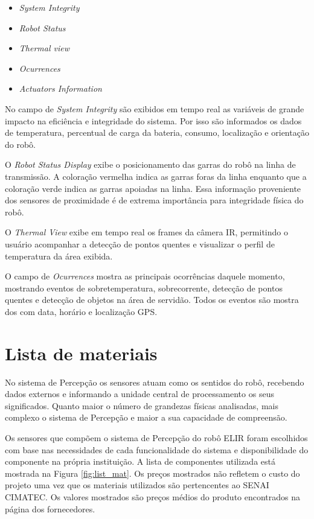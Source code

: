 \begin{itemize}
	\item \textit{System Integrity}
	\item \textit{Robot Status}
	\item \textit{Thermal view}
	\item \textit{Ocurrences}
	\item \textit{Actuators Information}
\end{itemize}

No campo de \textit{System Integrity} são exibidos em tempo real as variáveis de grande impacto na eficiência e integridade do sistema. Por isso são informados os dados de temperatura, percentual de carga da bateria, consumo, localização e orientação do robô.

O \textit{Robot Status Display} exibe o posicionamento das garras do robô na linha de transmissão. A coloração vermelha indica as garras foras da linha enquanto que a coloração verde indica as garras apoiadas na linha. Essa informação proveniente dos sensores de proximidade é de extrema importância para integridade física do robô.

O \textit{Thermal View} exibe em  tempo real os frames da câmera IR, permitindo o usuário acompanhar a detecção de pontos quentes e visualizar o perfil de temperatura da área exibida. 

O campo de \textit{Ocurrences} mostra as principais ocorrências daquele momento, mostrando eventos de sobretemperatura, sobrecorrente, detecção de pontos quentes e detecção de objetos na área de servidão. Todos os eventos são mostra
dos com data, horário e localização GPS. 


\section{Lista de materiais}
No sistema de Percepção os sensores atuam como os sentidos do robô, recebendo dados externos e informando a unidade central de processamento os seus significados. Quanto maior o número de grandezas físicas analisadas, mais complexo o sistema de Percepção e maior a sua capacidade de compreensão.

Os sensores que compõem o sistema de Percepção do robô ELIR foram escolhidos com base nas necessidades de cada funcionalidade do sistema e disponibilidade do componente na própria instituição. A lista de componentes utilizada está mostrada na Figura \ref{fig:list_mat}. Os preços mostrados não refletem o custo do projeto uma vez que os materiais utilizados são pertencentes ao SENAI CIMATEC. Os valores mostrados são preços médios do produto encontrados na página dos fornecedores.

